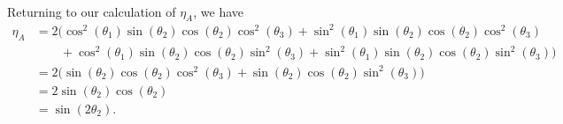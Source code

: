 \documentclass[reqno]{amsart}
\numberwithin{lemma}{section}
\numberwithin{proposition}{section}
\begin{document}
{\begin{align*}
\end{align*}
Returning to our calculation of $\eta_{A}$, we have
\begin{align*}
\eta_{A} &= 2 \Big ( \cos^{2}(\theta_{1}) \sin(\theta_{2}) \cos(\theta_{2}) \cos^{2}(\theta_{3}) + \sin^{2}(\theta_{1}) \sin(\theta_{2}) \cos(\theta_{2}) \cos^{2}(\theta_{3})\\
& \qquad + \cos^{2}(\theta_{1}) \sin(\theta_{2}) \cos(\theta_{2}) \sin^{2}(\theta_{3}) + \sin^{2}(\theta_{1}) \sin(\theta_{2}) \cos(\theta_{2}) \sin^{2}(\theta_{3}) \Big )\\
&= 2 \Big ( \sin(\theta_{2}) \cos(\theta_{2}) \cos^{2}(\theta_{3}) + \sin(\theta_{2}) \cos(\theta_{2}) \sin^{2}(\theta_{3}) \Big )\\
&= 2 \sin(\theta_{2}) \cos(\theta_{2})\\
&= \sin(2 \theta_{2}).
\end{align*}

}
\end{document}
